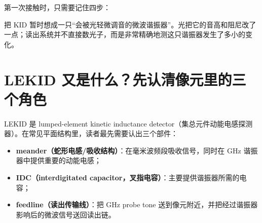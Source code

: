 \documentclass[11pt,a4paper,openany]{ctexrep}
\begin{document}
第一次接触时，只需要记住四步：
\begin{center}
\end{center}

\begin{intuitionbox}
把 KID 暂时想成一只“会被光轻微调音的微波谐振器”。光把它的音高和阻尼改了一点；读出系统并不直接数光子，而是非常精确地测这只谐振器发生了多小的变化。
\end{intuitionbox}

\section{LEKID 又是什么？先认清像元里的三个角色}
LEKID 是 lumped-element kinetic inductance detector（集总元件动能电感探测器）。在常见平面结构里，读者最先需要认出三个部件：
\begin{itemize}
  \item \textbf{meander（蛇形电感/吸收结构）}：在毫米波频段吸收信号，同时在 GHz 谐振器中提供重要的动能电感；
  \item \textbf{IDC（interdigitated capacitor，叉指电容）}：主要提供谐振器所需的电容；
  \item \textbf{feedline（读出传输线）}：把 GHz probe tone 送到像元附近，并把经过谐振器影响后的微波信号送回读出链。
\end{itemize}
\end{document}
